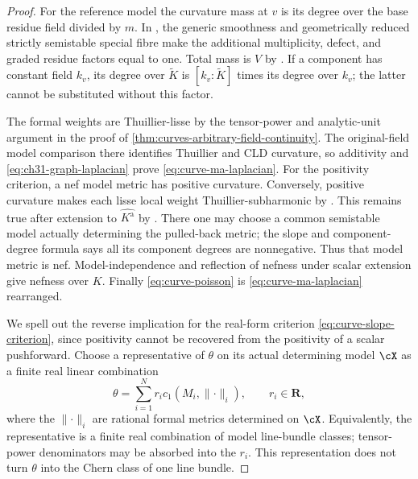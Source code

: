 \begin{proof}
For the reference model the curvature mass at \(v\) is its degree
over the base residue field divided by \(m\).
In \cite[Theorem~18.5.5 and Proposition~18.5.6(a)--(c)]{CLD25},
the generic smoothness and geometrically reduced strictly semistable
special fibre make the additional multiplicity, defect, and graded
residue factors equal to one.  Total mass is \(V\) by
\cite[Theorem~18.3.11]{CLD25}.
If a component has constant field \(k_v\), its degree over
\(\widetilde K\) is \([k_v:\widetilde K]\) times its degree over
\(k_v\); the latter cannot be substituted without this factor.

The formal weights are Thuillier-lisse by the tensor-power and
analytic-unit argument in the proof of
\cref{thm:curves-arbitrary-field-continuity}.
The original-field model comparison there identifies Thuillier and
CLD curvature, so additivity and \eqref{eq:ch31-graph-laplacian}
prove \eqref{eq:curve-ma-laplacian}.
For the positivity criterion, a nef model metric has positive
curvature.  Conversely, positive curvature makes each lisse local
weight Thuillier-subharmonic by \cite[Theorem~3.4.12(ii)]{Thu05}.
This remains true after extension to \(\widehat{K^{\mathrm a}}\)
by \cite[Corollary~3.4.5]{Thu05}.  There one may choose a common
semistable model actually determining the pulled-back metric; the
slope and component-degree formula
\cite[Proposition~3.7]{GJKM19} says all its component degrees are
nonnegative.  Thus that model metric is nef.
Model-independence and reflection of nefness under scalar extension
\cite[Proposition~3.5 and Lemma~3.3]{GM19} give nefness over \(K\).
Finally \eqref{eq:curve-poisson} is
\eqref{eq:curve-ma-laplacian} rearranged.

We spell out the reverse implication for the real-form criterion
\eqref{eq:curve-slope-criterion}, since positivity cannot be recovered
from the positivity of a scalar pushforward.
Choose a representative of \(\theta\) on its actual determining
model \(\cX\) as a finite real linear combination
\[
       \theta=\sum_{i=1}^N r_i
                   c_1(M_i,\lVert\cdot\rVert_i),
       \qquad r_i\in\mathbf R,
\]
where the \(\lVert\cdot\rVert_i\) are rational formal metrics
determined on \(\cX\).  Equivalently, the representative is a finite
real combination of model line-bundle classes; tensor-power
denominators may be absorbed into the \(r_i\).
This representation does not turn \(\theta\) into the Chern class
of one line bundle.


\end{proof}
